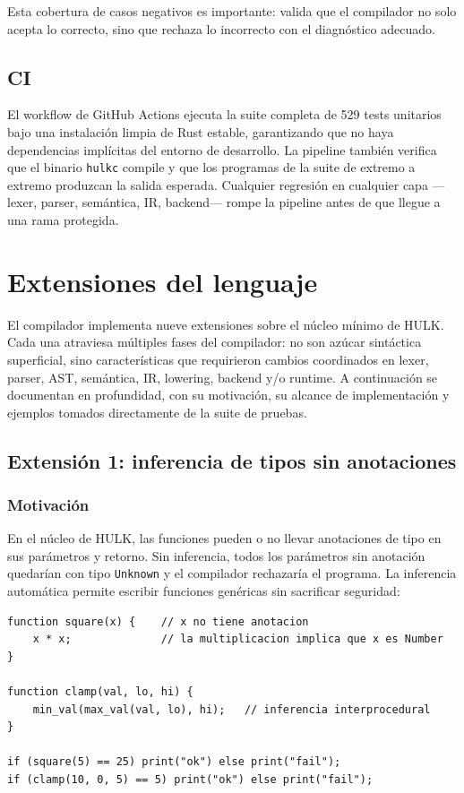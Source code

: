 \documentclass[12pt,letterpaper]{article}
\newcommand{\hulk}{\textsc{HULK}}
\newcommand{\src}[1]{\texttt{#1}}
\begin{document}
Esta cobertura de casos negativos es importante: valida que el compilador no solo acepta lo correcto, sino que rechaza lo incorrecto con el diagnóstico adecuado.

\subsection{CI}

El workflow de GitHub Actions ejecuta la suite completa de 529 tests unitarios bajo una instalación limpia de Rust estable, garantizando que no haya dependencias implícitas del entorno de desarrollo. La pipeline también verifica que el binario \src{hulkc} compile y que los programas de la suite de extremo a extremo produzcan la salida esperada. Cualquier regresión en cualquier capa —lexer, parser, semántica, IR, backend— rompe la pipeline antes de que llegue a una rama protegida.

\section{Extensiones del lenguaje}

El compilador implementa nueve extensiones sobre el núcleo mínimo de \hulk{}. Cada una atraviesa múltiples fases del compilador: no son azúcar sintáctica superficial, sino características que requirieron cambios coordinados en lexer, parser, AST, semántica, IR, lowering, backend y/o runtime. A continuación se documentan en profundidad, con su motivación, su alcance de implementación y ejemplos tomados directamente de la suite de pruebas.

\subsection{Extensión 1: inferencia de tipos sin anotaciones}

\subsubsection{Motivación}

En el núcleo de \hulk{}, las funciones pueden o no llevar anotaciones de tipo en sus parámetros y retorno. Sin inferencia, todos los parámetros sin anotación quedarían con tipo \src{Unknown} y el compilador rechazaría el programa. La inferencia automática permite escribir funciones genéricas sin sacrificar seguridad:

\begin{lstlisting}[language=HULK,caption={Inferencia de tipos desde el cuerpo y el sitio de llamada}]
function square(x) {    // x no tiene anotacion
    x * x;              // la multiplicacion implica que x es Number
}

function clamp(val, lo, hi) {
    min_val(max_val(val, lo), hi);   // inferencia interprocedural
}

if (square(5) == 25) print("ok") else print("fail");
if (clamp(10, 0, 5) == 5) print("ok") else print("fail");
\end{lstlisting}
\end{document}
